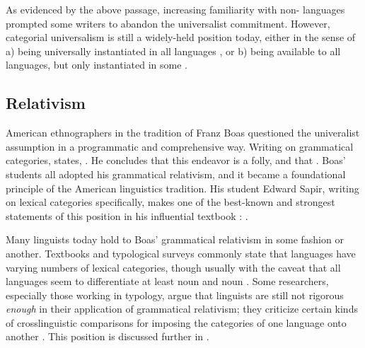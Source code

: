 As evidenced by the above passage, increasing familiarity with non- languages prompted some writers to abandon the universalist commitment. However, categorial universalism is still a widely-held position today, either in the sense of a) being universally instantiated in all languages , or b) being available to all languages, but only instantiated in some .

\subsection{Relativism}
\label{sec:2.2.2}

American ethnographers in the tradition of Franz Boas questioned the univeralist assumption in a programmatic and comprehensive way. Writing on grammatical categories, \citeauthor{Boas1911} states, . He concludes that this endeavor is a folly, and that . Boas' students all adopted his grammatical relativism, and it became a foundational principle of the American linguistics tradition. His student Edward Sapir, writing on lexical categories specifically, makes one of the best-known and strongest statements of this position in his influential textbook : .

Many linguists today hold to Boas' grammatical relativism in some fashion or another. Textbooks and typological surveys commonly state that languages have varying numbers of lexical categories, though usually with the caveat that all languages seem to differentiate at least noun and noun \parencite[e.g.][§6.2]{Velupillai2012}. Some researchers, especially those working in typology, argue that linguists are still not rigorous \emph{enough} in their application of grammatical relativism; they criticize certain kinds of crosslinguistic comparisons for imposing the categories of one language onto another \parencites{Croft2001b}{Gil2001}{Haspelmath2010a}{Haspelmath2012}{LaPolla2016}. This position is discussed further in .

